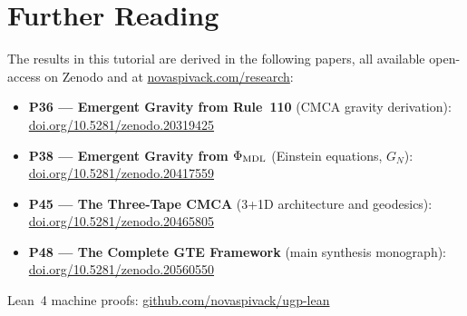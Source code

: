 \documentclass[11pt,a4paper]{article}
\begin{document}
\section*{Further Reading}
\begin{tcolorbox}[colback=orange!8,colframe=orange!50!black,
  title=\textbf{Primary Sources}]
The results in this tutorial are derived in the following papers,
all available open-access on Zenodo and at
\href{https://novaspivack.com/research}{novaspivack.com/research}:
\begin{itemize}
  \item \textbf{P36 --- Emergent Gravity from Rule~110} (CMCA gravity derivation):\\
        \href{https://doi.org/10.5281/zenodo.20319425}{doi.org/10.5281/zenodo.20319425}
  \item \textbf{P38 --- Emergent Gravity from $\Phi_{\rm MDL}$} (Einstein equations, $G_N$):\\
        \href{https://doi.org/10.5281/zenodo.20417559}{doi.org/10.5281/zenodo.20417559}
  \item \textbf{P45 --- The Three-Tape CMCA} (3+1D architecture and geodesics):\\
        \href{https://doi.org/10.5281/zenodo.20465805}{doi.org/10.5281/zenodo.20465805}
  \item \textbf{P48 --- The Complete GTE Framework} (main synthesis monograph):\\
        \href{https://doi.org/10.5281/zenodo.20560550}{doi.org/10.5281/zenodo.20560550}
\end{itemize}
Lean~4 machine proofs: \href{https://github.com/novaspivack/ugp-lean}{github.com/novaspivack/ugp-lean}
\end{tcolorbox}


\end{document}
